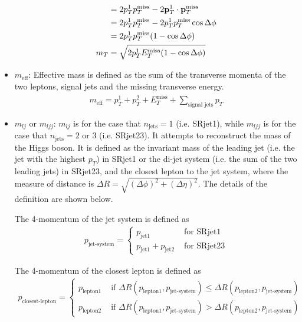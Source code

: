 \begin{itemize}
\begin{align}
&= 2 p_T^1 p_T^{\text{miss}} - 2 {\bf p}_T^1  \cdot {\bf p}_T^{\text{miss}} \\
&= 2 p_T^1 p_T^{\text{miss}} - 2 p_T^1 p_T^{\text{miss}} \cos{\Delta\phi} \\
&= 2 p_T^1 p_T^{\text{miss}} ( 1 - \cos{\Delta\phi} ) \\
m_T &= \sqrt{ 2 p_T^1 E_T^{\text{miss}} ( 1 - \cos{\Delta\phi} ) } \label{equ:mT_approx}
\end{align}
\item $m_{\text{eff}}$:
Effective mass is defined as the sum of the transverse momenta of the two leptons, signal jets and the missing transverse energy.
\begin{align}
m_{\text{eff}} = p_T^1 + p_T^2 + E_T^{\text{miss}} + \sum_{\text {signal jets}} p_T
\end{align}
\item $m_{lj}$ or $m_{ljj}$:
$m_{lj}$ is for the case that $n_{\text{jets}} = 1$ (i.e. SRjet1), while $m_{ljj}$ is for the case that $n_{\text{jets}} = 2$ or $3$ (i.e. SRjet23).
It attempts to reconstruct the mass of the Higgs boson.
It is defined as the invariant mass of the leading jet (i.e. the jet with the highest $p_T$) in SRjet1 or the di-jet system (i.e. the sum of the two leading jets) in SRjet23, and the closest lepton to the jet system, where the measure of distance is $\Delta R = \sqrt{(\Delta\phi)^2 + (\Delta\eta)^2}$.
The details of the definition are shown below.

The 4-momentum of the jet system is defined as
\begin{align}
p_{\text{jet-system}} =
\left\{
\begin{array}{ll}
p_{\text{jet1}} &\text{ for SRjet1}\\
p_{\text{jet1}} + p_{\text{jet2}} &\text{ for SRjet23}
\end{array} \right.
\end{align}

The 4-momentum of the closest lepton is defined as
\begin{align}
p_{\text{closest-lepton}} =
\left\{
\begin{array}{ll}
p_{\text{lepton1}} &\text{ if } \Delta R(p_{\text{lepton1}},p_{\text{jet-system}}) \leq \Delta R(p_{\text{lepton2}},p_{\text{jet-system}}) \\
p_{\text{lepton2}} &\text{ if } \Delta R(p_{\text{lepton1}},p_{\text{jet-system}}) > \Delta R(p_{\text{lepton2}},p_{\text{jet-system}})
\end{array} \right.
\end{align}


\end{itemize}

